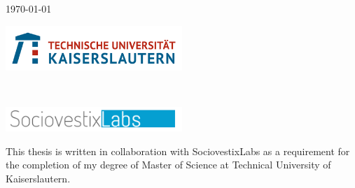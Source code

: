 \begin{titlepage}


{\large \today}\\[3cm] %
\vspace{4.5cm}

\begin{minipage}[b]{0.4\textwidth}
\begin{flushleft} \large
\includegraphics[width=0.5\textwidth]{figures/download}\\[1cm] %
\end{flushleft}
\end{minipage}
~
\begin{minipage}[b]{0.4\textwidth}
\begin{flushleft} \large
\includegraphics[width=0.5\textwidth]{figures/download (1)}
\end{flushleft}
\end{minipage}


\vfill %

\end{titlepage}

\begin{titlepage}
	This thesis is written in collaboration with SociovestixLabs as a requirement for the completion of my degree of Master of Science at Technical University of Kaiserslautern.
\end{titlepage}
